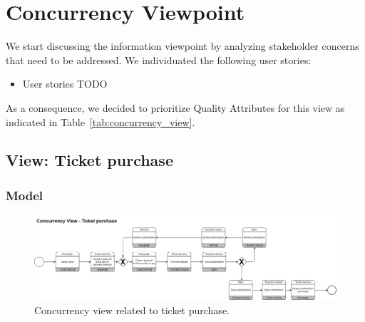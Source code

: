 

\section{Concurrency Viewpoint}
We start discussing the information viewpoint by analyzing stakeholder concerns that need to be addressed.
We individuated the following user stories:
\begin{itemize}
    \item User stories TODO
\end{itemize}

As a consequence, we decided to prioritize Quality Attributes for this view as indicated in Table~\ref{tab:concurrency_view}.
\begin{table}[h!]
    \centering
    \caption{Concurrency View Prioritized Quality Attributes}
    \label{tab:concurrency_view}
\end{table}

\subsection{View: Ticket purchase}
\subsubsection{Model}

\begin{figure}[H]
    \centering
    \includegraphics[width=\textwidth]{drawings/views_final_version/concurrency_view_1.png}
    \caption{Concurrency view related to ticket purchase.}
    \label{fig:concurrency_view_1}
\end{figure}

